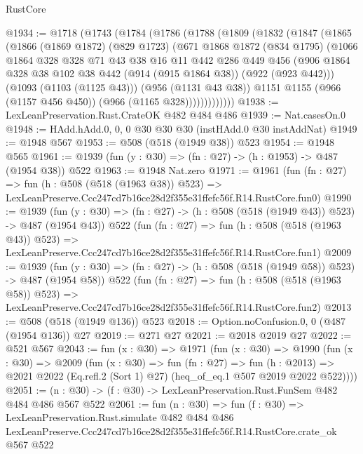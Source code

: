 \begin{lexlean}{RustCore}
\begin{coremodule}
@1934 := @1718
    (@1743
      (@1784
        (@1786
          (@1788
            (@1809
              (@1832
                (@1847
                  (@1865
                    (@1866
                      (@1869 @1872)
                      (@829 @1723)
                      (@671
                        @1868
                        @1872
                        (@834 @1795)
                        (@1066
                          @1864
                          @328
                          @328
                          @71
                          @43
                          @38
                          @16
                          @11
                          @442
                          @286
                          @449
                          @456
                          (@906
                            @1864
                            @328
                            @38
                            @102
                            @38
                            @442
                            (@914 (@915 @1864 @38))
                            (@922 (@923 @442)))
                          (@1093 (@1103 (@1125 @43)))
                          (@956 (@1131 @43 @38))
                          @1151
                          @1155
                          (@966 (@1157 @456 @450))
                          (@966 (@1165 @328)))))))))))))
@1938 := LexLeanPreservation.Rust.CrateOK @482 @484 @486
@1939 := Nat.casesOn.{0}
@1948 := HAdd.hAdd.{0, 0, 0} @30 @30 @30 (instHAdd.{0} @30 instAddNat)
@1949 := @1948 @567
@1953 := @508 (@518 (@1949 @38)) @523
@1954 := @1948 @565
@1961 := @1939 (fun (y : @30) => (fn : @27) -> (h : @1953) -> @487 (@1954 @38)) @522
@1963 := @1948 Nat.zero
@1971 := @1961
    (fun (fn : @27) =>
    fun (h : @508 (@518 (@1963 @38)) @523) =>
    LexLeanPreserve.Ccc247cd7b16ce28d2f355e31ffefc56f.R14.RustCore.fun0)
@1990 := @1939
    (fun (y : @30) => (fn : @27) -> (h : @508 (@518 (@1949 @43)) @523) -> @487 (@1954 @43))
    @522
    (fun (fn : @27) =>
    fun (h : @508 (@518 (@1963 @43)) @523) =>
    LexLeanPreserve.Ccc247cd7b16ce28d2f355e31ffefc56f.R14.RustCore.fun1)
@2009 := @1939
    (fun (y : @30) => (fn : @27) -> (h : @508 (@518 (@1949 @58)) @523) -> @487 (@1954 @58))
    @522
    (fun (fn : @27) =>
    fun (h : @508 (@518 (@1963 @58)) @523) =>
    LexLeanPreserve.Ccc247cd7b16ce28d2f355e31ffefc56f.R14.RustCore.fun2)
@2013 := @508 (@518 (@1949 @136)) @523
@2018 := Option.noConfusion.{0, 0} (@487 (@1954 @136)) @27
@2019 := @271 @27
@2021 := @2018 @2019 @27
@2022 := @521 @567
@2043 := fun (x : @30) =>
  @1971
    (fun (x : @30) =>
    @1990
      (fun (x : @30) =>
      @2009
        (fun (x : @30) =>
        fun (fn : @27) =>
        fun (h : @2013) =>
        @2021 @2022 (Eq.refl.{2} (Sort 1) @27) (heq_of_eq.{1} @507 @2019 @2022 @522))))
@2051 := (n : @30) -> (f : @30) -> LexLeanPreservation.Rust.FunSem @482 @484 @486 @567 @522
@2061 := fun (n : @30) =>
  fun (f : @30) =>
  LexLeanPreservation.Rust.simulate
    @482
    @484
    @486
    LexLeanPreserve.Ccc247cd7b16ce28d2f355e31ffefc56f.R14.RustCore.crate_ok
    @567
    @522
\end{coremodule}
\end{lexlean}
